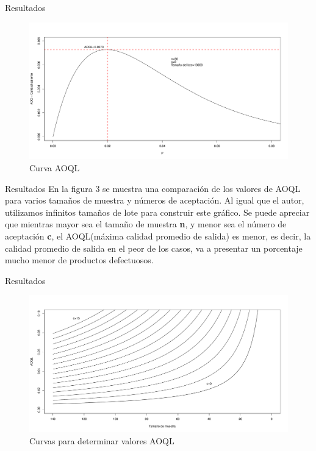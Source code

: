 \documentclass[10pt]{beamer}
\begin{document}
\begin{frame}{Resultados}
\begin{figure}[h!]
  \centering
  \includegraphics[scale=0.34]{FigurasUV/Figura3.pdf}
  \caption{Curva AOQL}
\end{figure}
\end{frame}

\begin{frame}{Resultados}
En la figura 3 se muestra una comparación de los valores de AOQL para varios tamaños de muestra y números de aceptación. Al igual que el autor, utilizamos infinitos tamaños de lote para construir este gráfico. Se puede apreciar que mientras mayor sea el tamaño de muestra \textbf{n}, y menor sea el número de aceptación \textbf{c}, el AOQL(máxima calidad promedio de salida) es menor, es decir, la calidad promedio de salida en el peor de los casos, va a presentar un porcentaje mucho menor de productos defectuosos.
\end{frame}

\begin{frame}{Resultados}
\begin{figure}[h!]
  \centering
  \includegraphics[scale=0.33]{FigurasUV/Figura4.pdf}
  \caption{Curvas para determinar valores AOQL}
\end{figure}
\end{frame}
\end{document}
